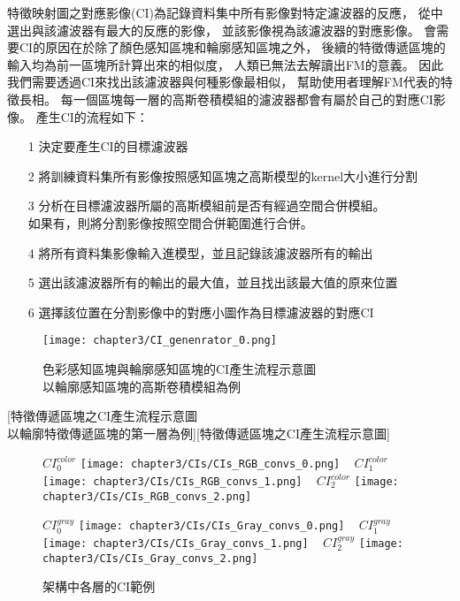 \documentclass[class=NCU_thesis, crop=false]{standalone}
\begin{document}
	特徵映射圖之對應影像(CI)為記錄資料集中所有影像對特定濾波器的反應，
	從中選出與該濾波器有最大的反應的影像，
	並該影像視為該濾波器的對應影像。
	會需要CI的原因在於除了顏色感知區塊和輪廓感知區塊之外，
	後續的特徵傳遞區塊的輸入均為前一區塊所計算出來的相似度，
	人類已無法去解讀出FM的意義。
	因此我們需要透過CI來找出該濾波器與何種影像最相似，
	幫助使用者理解FM代表的特徵長相。
	每一個區塊每一層的高斯卷積模組的濾波器都會有屬於自己的對應CI影像。
	產生CI的流程如下：
	\begin{itemize}
		\item [1]
		決定要產生CI的目標濾波器
		\item [2]
		將訓練資料集所有影像按照感知區塊之高斯模型的kernel大小進行分割
		\item [3]
		分析在目標濾波器所屬的高斯模組前是否有經過空間合併模組。\\
		如果有，則將分割影像按照空間合併範圍進行合併。
		\item [4]
		將所有資料集影像輸入進模型，並且記錄該濾波器所有的輸出
		\item [5]
		選出該濾波器所有的輸出的最大值，並且找出該最大值的原來位置
		\item [6]
		選擇該位置在分割影像中的對應小圖作為目標濾波器的對應CI
	\end{itemize}


	\begin{figure}[H]
	\centering
	\label{fig:CI_generator_0}
	\captionsetup{justification=centering}
	\caption{色彩感知區塊與輪廓感知區塊的CI產生流程示意圖 \\ 以輪廓感知區塊的高斯卷積模組為例}
	\texttt{[image: chapter3/CI\_genenrator\_0.png]}
	\end{figure}

	[特徵傳遞區塊之CI產生流程示意圖 \\
	以輪廓特徵傳遞區塊的第一層為例][特徵傳遞區塊之CI產生流程示意圖]

	\begin{figure}[H]
    \centering
    \subcaptionbox
        {$CI^{color}_0$
        \label{fig:CI_color_0}}
        {\texttt{[image: chapter3/CIs/CIs\_RGB\_convs\_0.png]}}
    ~
    \subcaptionbox
        {$CI^{color}_1$
        \label{fig:CI_color_1}}
        {\texttt{[image: chapter3/CIs/CIs\_RGB\_convs\_1.png]}}
    ~
    \subcaptionbox
        {$CI^{color}_2$
        \label{fig:CI_color_2}}
        {\texttt{[image: chapter3/CIs/CIs\_RGB\_convs\_2.png]}}

     \subcaptionbox
        {$CI^{gray}_0$
        \label{fig:CI_gray_0}}
        {\texttt{[image: chapter3/CIs/CIs\_Gray\_convs\_0.png]}}
    ~
    \subcaptionbox
        {$CI^{gray}_1$
        \label{fig:CI_gray_1}}
        {\texttt{[image: chapter3/CIs/CIs\_Gray\_convs\_1.png]}}
    ~
    \subcaptionbox
        {$CI^{gray}_2$
        \label{fig:CI_gray_2}}
        {\texttt{[image: chapter3/CIs/CIs\_Gray\_convs\_2.png]}}
    \caption{架構中各層的CI範例}
    \label{fig:CIs}
	\end{figure}
\end{document}
